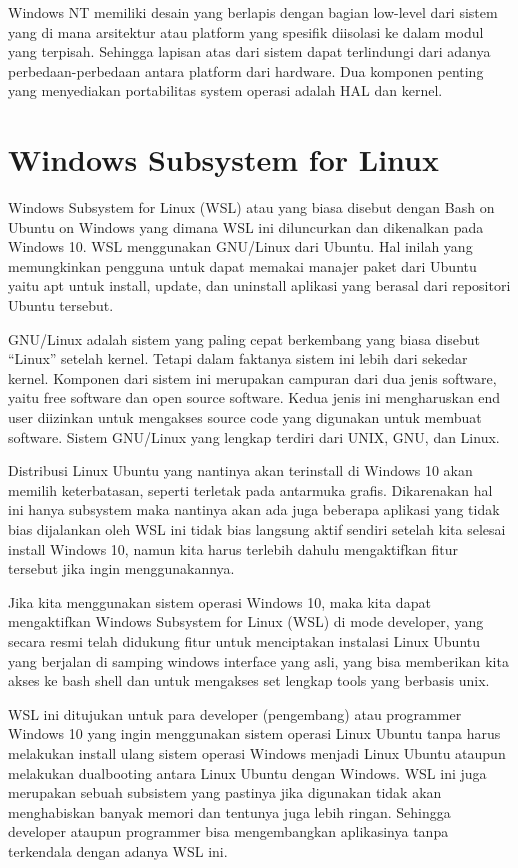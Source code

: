\begin{enumeratae}
Windows NT memiliki desain yang berlapis dengan bagian low-level dari sistem yang di mana arsitektur atau platform yang spesifik diisolasi ke dalam modul yang terpisah. Sehingga lapisan atas dari sistem dapat terlindungi dari adanya perbedaan-perbedaan antara platform dari hardware. Dua komponen penting yang menyediakan portabilitas system operasi adalah HAL dan kernel.


\section{Windows Subsystem for Linux}
Windows Subsystem for Linux (WSL) atau yang biasa disebut dengan Bash on Ubuntu on Windows yang dimana WSL ini diluncurkan dan dikenalkan pada Windows 10. WSL menggunakan GNU/Linux dari Ubuntu. Hal inilah yang memungkinkan pengguna untuk dapat memakai manajer paket dari Ubuntu yaitu apt untuk install, update, dan uninstall aplikasi yang berasal dari repositori Ubuntu tersebut.

GNU/Linux adalah sistem yang paling cepat berkembang yang biasa disebut “Linux” setelah kernel. Tetapi dalam faktanya sistem ini lebih dari sekedar kernel. Komponen dari sistem ini merupakan campuran dari dua jenis software, yaitu free software dan open source software. Kedua jenis ini mengharuskan end user diizinkan untuk mengakses source code yang digunakan untuk membuat software. Sistem GNU/Linux yang lengkap terdiri dari UNIX, GNU, dan Linux.

Distribusi Linux Ubuntu yang nantinya akan terinstall di Windows 10 akan memilih keterbatasan, seperti terletak pada antarmuka grafis. Dikarenakan hal ini hanya subsystem maka nantinya akan ada juga beberapa aplikasi yang tidak bias dijalankan oleh WSL ini tidak bias langsung aktif sendiri setelah kita selesai install Windows 10, namun kita harus terlebih dahulu mengaktifkan fitur tersebut jika ingin menggunakannya.

Jika kita menggunakan sistem operasi Windows 10, maka kita dapat mengaktifkan Windows Subsystem for Linux (WSL) di mode developer, yang secara resmi telah didukung fitur untuk menciptakan instalasi Linux Ubuntu yang berjalan di samping windows interface yang asli, yang bisa memberikan kita akses ke bash shell dan untuk mengakses set lengkap tools yang berbasis unix.

WSL ini ditujukan untuk para developer (pengembang) atau programmer Windows 10 yang ingin menggunakan sistem operasi Linux Ubuntu tanpa harus melakukan install ulang sistem operasi Windows menjadi Linux Ubuntu ataupun melakukan dualbooting antara Linux Ubuntu dengan Windows. WSL ini juga merupakan sebuah subsistem yang pastinya jika digunakan tidak akan menghabiskan banyak memori dan tentunya juga lebih ringan. Sehingga developer ataupun programmer bisa mengembangkan aplikasinya tanpa terkendala dengan adanya WSL ini.


\end{enumeratae}
